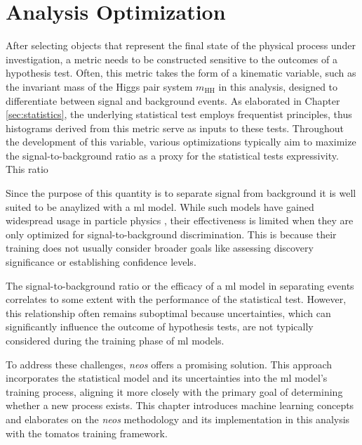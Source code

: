 \chapter{Analysis Optimization}\label{sec:analysis_optimization}
After selecting objects that represent the final state of the physical process under investigation, a metric needs to be constructed sensitive to the outcomes of a hypothesis test. Often, this metric takes the form of a kinematic variable, such as the invariant mass of the Higgs pair system $m_\text{HH}$ in this analysis, designed to differentiate between signal and background events. As elaborated in Chapter \ref{sec:statistics}, the underlying statistical test employs frequentist principles, thus histograms derived from this metric serve as inputs to these tests. Throughout the development of this variable, various optimizations typically aim to maximize the signal-to-background ratio as a proxy for the statistical tests expressivity. This ratio

Since the purpose of this quantity is to separate signal from background it is well suited to be anaylized with a \ac{ml} model. While such models have gained widespread usage in particle physics \citep{albertsson2019machine,shlomi2020graph,feickert2021living,Schwartz2021Modern}, their effectiveness is limited when they are only optimized for signal-to-background discrimination. This is because their training does not usually consider broader goals like assessing discovery significance or establishing confidence levels.

The signal-to-background ratio or the efficacy of a \ac{ml} model in separating events correlates to some extent with the performance of the statistical test. However, this relationship often remains suboptimal because uncertainties, which can significantly influence the outcome of hypothesis tests, are not typically considered during the training phase of \ac{ml} models.

To address these challenges, \textit{\ac{neos}} \citep{Simpson_2023} offers a promising solution. This approach incorporates the statistical model and its uncertainties into the \ac{ml} model's training process, aligning it more closely with the primary goal of determining whether a new process exists. This chapter introduces machine learning concepts and elaborates on the \textit{\ac{neos}} methodology and its implementation in this analysis with the \ac{tomatos} training framework.


